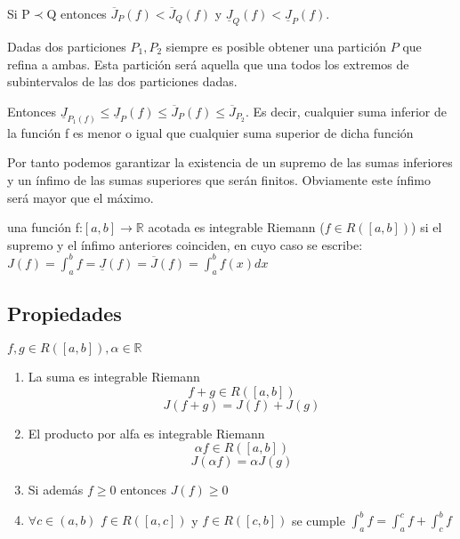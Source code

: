 \documentclass{apuntes}
\begin{document}
Si P$\prec$Q entonces $\overline{J}_P(f) < \overline{J}_Q(f)$  y $\underline{J}_Q(f) < \underline{J}_P(f)$.

Dadas dos particiones $P_1,P_2$ siempre es posible obtener una partición $P$ que refina a ambas. Esta partición será aquella que una todos los extremos de subintervalos de las dos particiones dadas.

Entonces $\underline{J}_{P_1(f)} \leq \underline{J}_P(f) \leq \overline{J}_P(f) \leq \overline{J}_{P_2}$. Es decir, cualquier suma inferior de la función f es menor o igual que cualquier suma superior de dicha función

Por tanto podemos garantizar la existencia de un supremo de las sumas inferiores y un ínfimo de las sumas superiores que serán finitos. Obviamente este ínfimo será mayor que el máximo.

\begin{defn}
una función f:$[ a,b] \rightarrow \mathbb{R}$ acotada es integrable Riemann ($f \in R([a,b])$) si el supremo y el ínfimo anteriores coinciden, en cuyo caso se escribe:
$J(f) = \int_a^b f = \underline{J}(f) = \overline{J}(f) = \int_a^b f(x) dx$
\end{defn}

\subsection{Propiedades}
$f,g \in R([a,b]), \alpha \in \mathbb{R}$
\begin{enumerate}
\item La suma es integrable Riemann
\[f + g \in R([a,b])\]\[ J(f+g) = J(f) + J(g)\]
\item El producto por alfa es integrable Riemann
\[\alpha f \in R([a,b])\] \[ J(\alpha f) = \alpha J(g)\]
\item Si además $f\geq 0$ entonces $J(f)\geq 0$
\item $\forall c \in (a,b)$ $f\in R([a,c])$  y $f\in R([c,b])$ se cumple
$\int_a^b f = \int_a^c f + \int_c^b f$
\end{enumerate}
\end{document}
